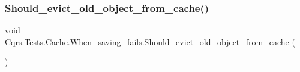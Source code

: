 \subsubsection{\texorpdfstring{Should\+\_\+evict\+\_\+old\+\_\+object\+\_\+from\+\_\+cache()}{Should\_evict\_old\_object\_from\_cache()}}
{\footnotesize\ttfamily void Cqrs.\+Tests.\+Cache.\+When\+\_\+saving\+\_\+fails.\+Should\+\_\+evict\+\_\+old\+\_\+object\+\_\+from\+\_\+cache (\begin{DoxyParamCaption}{ }\end{DoxyParamCaption})}

